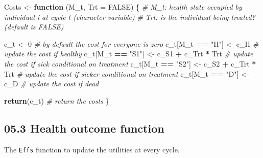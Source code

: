 \documentclass[
]{article}
\newenvironment{Shaded}{\begin{snugshade}}{\end{snugshade}}
\newcommand{\CommentTok}[1]{\textcolor[rgb]{0.56,0.35,0.01}{\textit{#1}}}
\newcommand{\ControlFlowTok}[1]{\textcolor[rgb]{0.13,0.29,0.53}{\textbf{#1}}}
\newcommand{\DataTypeTok}[1]{\textcolor[rgb]{0.13,0.29,0.53}{#1}}
\newcommand{\DecValTok}[1]{\textcolor[rgb]{0.00,0.00,0.81}{#1}}
\newcommand{\KeywordTok}[1]{\textcolor[rgb]{0.13,0.29,0.53}{\textbf{#1}}}
\newcommand{\NormalTok}[1]{#1}
\newcommand{\OperatorTok}[1]{\textcolor[rgb]{0.81,0.36,0.00}{\textbf{#1}}}
\newcommand{\OtherTok}[1]{\textcolor[rgb]{0.56,0.35,0.01}{#1}}
\newcommand{\StringTok}[1]{\textcolor[rgb]{0.31,0.60,0.02}{#1}}
\begin{document}
\begin{Shaded}
\begin{Highlighting}[]
\NormalTok{Costs <-}\StringTok{ }\ControlFlowTok{function}\NormalTok{ (M_t, }\DataTypeTok{Trt =} \OtherTok{FALSE}\NormalTok{) \{}
  \CommentTok{# M_t: health state occupied by individual i at cycle t (character variable)}
  \CommentTok{# Trt:  is the individual being treated? (default is FALSE) }
  
\NormalTok{  c_t <-}\StringTok{ }\DecValTok{0}                                 \CommentTok{# by default the cost for everyone is zero }
\NormalTok{  c_t[M_t }\OperatorTok{==}\StringTok{ "H"}\NormalTok{]  <-}\StringTok{ }\NormalTok{c_H                  }\CommentTok{# update the cost if healthy}
\NormalTok{  c_t[M_t }\OperatorTok{==}\StringTok{ "S1"}\NormalTok{] <-}\StringTok{ }\NormalTok{c_S1 }\OperatorTok{+}\StringTok{ }\NormalTok{c_Trt }\OperatorTok{*}\StringTok{ }\NormalTok{Trt   }\CommentTok{# update the cost if sick conditional on treatment}
\NormalTok{  c_t[M_t }\OperatorTok{==}\StringTok{ "S2"}\NormalTok{] <-}\StringTok{ }\NormalTok{c_S2 }\OperatorTok{+}\StringTok{ }\NormalTok{c_Trt }\OperatorTok{*}\StringTok{ }\NormalTok{Trt   }\CommentTok{# update the cost if sicker conditional on treatment}
\NormalTok{  c_t[M_t }\OperatorTok{==}\StringTok{ "D"}\NormalTok{]  <-}\StringTok{ }\NormalTok{c_D                  }\CommentTok{# update the cost if dead}
  
  \KeywordTok{return}\NormalTok{(c_t)                                  }\CommentTok{# return the costs}
\NormalTok{\}}
\end{Highlighting}
\end{Shaded}

\hypertarget{health-outcome-function}{%
\subsection{05.3 Health outcome
function}\label{health-outcome-function}}

The \texttt{Effs} function to update the utilities at every cycle.
\end{document}
